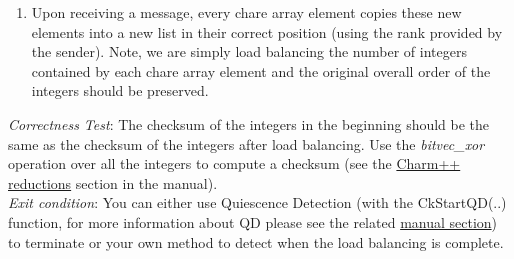 \documentclass{article}
\begin{document}
\begin{enumerate}




\item Upon receiving a message, every chare array element copies these new
elements into a new list in their correct position (using the rank provided by
the sender).
Note, we are simply load balancing the number of integers contained by each chare array element
and the original overall order of the integers should be preserved.
 
\end{enumerate}

\emph{Correctness Test}: The checksum of the integers in the beginning
should be the same as the checksum of the integers after load balancing.
Use the \emph{bitvec\_xor} operation over all the integers to compute a checksum (see the \href{http://charm.cs.uiuc.edu/manuals/html/charm++/4.html#SECTION01361000000000000000}{ Charm++
reductions} section in the manual). \\

\emph{Exit condition}: You can either use Quiescence Detection (with the CkStartQD(..) function, for more
information about QD please see the related
\href{http://charm.cs.illinois.edu/manuals/html/charm++/12.html#SECTION02350000000000000000}{manual
section}) to terminate or your own method to detect when
the load balancing is complete. \\
\end{document}
